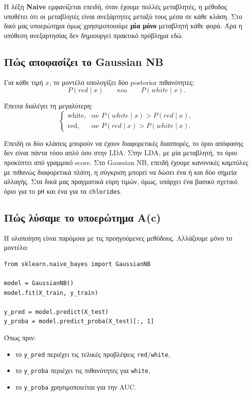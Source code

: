 \documentclass[11pt,a4paper]{article}
\newcommand{\code}[1]{\texttt{#1}}
\begin{document}
Η λέξη \textbf{Naive} εμφανίζεται επειδή, όταν έχουμε πολλές μεταβλητές, η
μέθοδος υποθέτει ότι οι μεταβλητές είναι ανεξάρτητες μεταξύ τους μέσα σε κάθε
κλάση. Στο δικό μας υποερώτημα όμως χρησιμοποιούμε \textbf{μία μόνο}
μεταβλητή κάθε φορά. Άρα η υπόθεση ανεξαρτησίας δεν δημιουργεί πρακτικό
πρόβλημα εδώ.

\subsection{Πώς αποφασίζει το Gaussian NB}

Για κάθε τιμή \(x\), το μοντέλο υπολογίζει δύο posterior πιθανότητες:
\[
P(red\mid x)
\qquad \text{και} \qquad
P(white\mid x).
\]

Έπειτα διαλέγει τη μεγαλύτερη:
\[
\begin{cases}
\text{white}, & \text{αν } P(white\mid x) > P(red\mid x),\\
\text{red}, & \text{αν } P(red\mid x) > P(white\mid x).
\end{cases}
\]

Επειδή οι δύο κλάσεις μπορούν να έχουν διαφορετικές διασπορές, το όριο
απόφασης δεν είναι πάντα τόσο απλό όσο στην LDA. Στην LDA, με μία μεταβλητή,
το όριο προκύπτει από γραμμικό score. Στο Gaussian NB, επειδή έχουμε
κανονικές καμπύλες με πιθανώς διαφορετικά πλάτη, η σύγκριση μπορεί να δώσει
ένα ή και δύο σημεία αλλαγής. Στα δικά μας πραγματικά εύρη τιμών, όμως,
υπάρχει ένα βασικό σχετικό όριο για το \code{pH} και ένα για τα
\code{chlorides}.

\subsection{Πώς λύσαμε το υποερώτημα Α(c)}

Η υλοποίηση είναι παρόμοια με τις προηγούμενες μεθόδους. Αλλάζουμε μόνο το
μοντέλο:

\begin{lstlisting}
from sklearn.naive_bayes import GaussianNB

model = GaussianNB()
model.fit(X_train, y_train)

y_pred = model.predict(X_test)
y_proba = model.predict_proba(X_test)[:, 1]
\end{lstlisting}

Όπως πριν:
\begin{itemize}
    \item το \code{y\_pred} περιέχει τις τελικές προβλέψεις \code{red}/\code{white},
    \item το \code{y\_proba} περιέχει τις πιθανότητες για \code{white},
    \item το \code{y\_proba} χρησιμοποιείται για την AUC.
\end{itemize}
\end{document}
